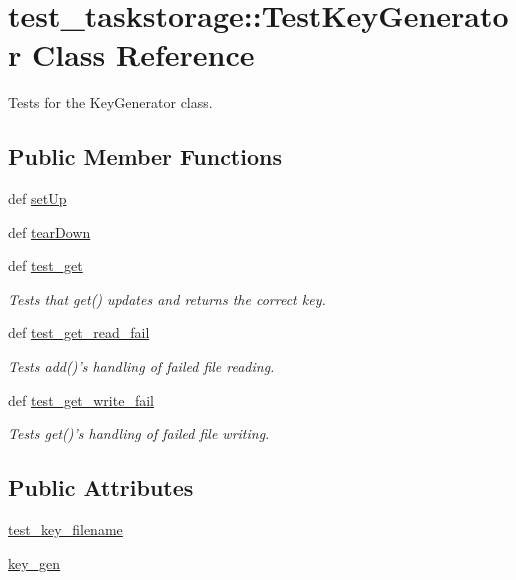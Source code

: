 \hypertarget{classtest__taskstorage_1_1TestKeyGenerator}{
\section{test\-\_\-taskstorage\-:\-:\-Test\-Key\-Generator \-Class \-Reference}
\label{classtest__taskstorage_1_1TestKeyGenerator}
}


\-Tests for the \-Key\-Generator class.  


\subsection*{\-Public \-Member \-Functions}
\begin{DoxyCompactItemize}
\item 
def \hyperlink{classtest__taskstorage_1_1TestKeyGenerator_a533dcdf1f1da6ba47e7262cd2126297a}{set\-Up}
\item 
def \hyperlink{classtest__taskstorage_1_1TestKeyGenerator_a30593a8e95195d49c402c2c2d5bf646a}{tear\-Down}
\item 
def \hyperlink{classtest__taskstorage_1_1TestKeyGenerator_a4c7695172cd521e303652adcdb7274f3}{test\-\_\-get}
\begin{DoxyCompactList}\small\item\em \-Tests that get() updates and returns the correct key. \end{DoxyCompactList}\item 
def \hyperlink{classtest__taskstorage_1_1TestKeyGenerator_a9ab98e4f91eb81aa6665a36d3de6634a}{test\-\_\-get\-\_\-read\-\_\-fail}
\begin{DoxyCompactList}\small\item\em \-Tests add()'s handling of failed file reading. \end{DoxyCompactList}\item 
def \hyperlink{classtest__taskstorage_1_1TestKeyGenerator_a1bd9843111bc62735066730f439d8ebe}{test\-\_\-get\-\_\-write\-\_\-fail}
\begin{DoxyCompactList}\small\item\em \-Tests get()'s handling of failed file writing. \end{DoxyCompactList}\end{DoxyCompactItemize}
\subsection*{\-Public \-Attributes}
\begin{DoxyCompactItemize}
\item 
\hyperlink{classtest__taskstorage_1_1TestKeyGenerator_adb68008fcc89343a931d48c552fb2b6a}{test\-\_\-key\-\_\-filename}
\item 
\hyperlink{classtest__taskstorage_1_1TestKeyGenerator_a40beb036a9c0151d1fd8bb3b4768fae9}{key\-\_\-gen}
\end{DoxyCompactItemize}


